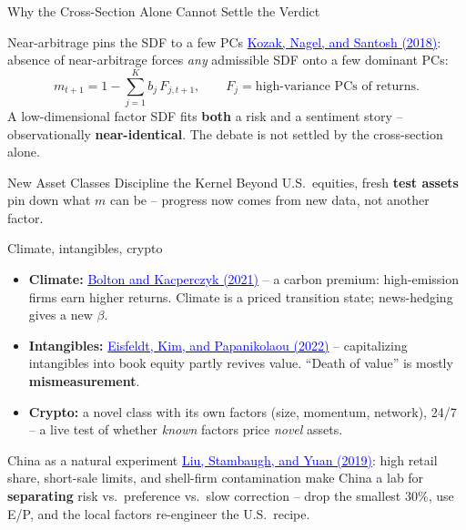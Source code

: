 \documentclass{beamer}
\begin{document}
\begin{frame}{Why the Cross-Section Alone Cannot Settle the Verdict}
\begin{block}{Near-arbitrage pins the SDF to a few PCs}
\href{https://doi.org/10.1111/jofi.12612}{\textcolor{blue}{Kozak, Nagel, and Santosh (2018)}}: absence of near-arbitrage forces \textit{any} admissible SDF onto a few dominant PCs:
\begin{equation*}
m_{t+1} = 1 - \sum_{j=1}^{K} b_j\, F_{j,t+1}, \qquad F_j = \text{high-variance PCs of returns.}
\end{equation*}
A low-dimensional factor SDF fits \textbf{both} a \alert{risk} and a \alert{sentiment} story -- observationally \textbf{near-identical}. The debate is \alert{not} settled by the cross-section alone.
\end{block}
\end{frame}

\begin{frame}{New Asset Classes Discipline the Kernel}
\small
Beyond U.S.\ equities, fresh \textbf{test assets} pin down what $m$ can be -- progress now comes from \alert{new data}, not another factor.
\begin{block}{Climate, intangibles, crypto}
\begin{itemize}
  \item \textbf{Climate:} \href{https://doi.org/10.1016/j.jfineco.2021.05.008}{\textcolor{blue}{Bolton and Kacperczyk (2021)}} -- a \alert{carbon premium}: high-emission firms earn higher returns. Climate is a priced transition state; news-hedging gives a new $\beta$.
  \item \textbf{Intangibles:} \href{https://www.nber.org/papers/w28056}{\textcolor{blue}{Eisfeldt, Kim, and Papanikolaou (2022)}} -- capitalizing intangibles into book equity \alert{partly revives} value. ``Death of value'' is mostly \textbf{mismeasurement}.
  \item \textbf{Crypto:} a novel class with its own factors (size, momentum, network), 24/7 -- a live test of whether \textit{known} factors price \textit{novel} assets.
\end{itemize}
\end{block}
\begin{block}{China as a natural experiment}
\href{https://doi.org/10.1016/j.jfineco.2019.03.008}{\textcolor{blue}{Liu, Stambaugh, and Yuan (2019)}}: high retail share, short-sale limits, and shell-firm contamination make China a lab for \textbf{separating} risk vs.\ preference vs.\ slow correction -- drop the smallest 30\%, use E/P, and the local factors re-engineer the U.S.\ recipe.
\end{block}
\end{frame}
\end{document}

